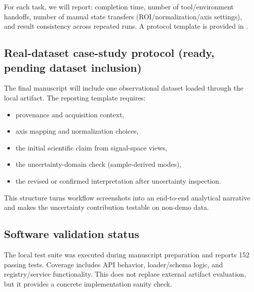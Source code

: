 \documentclass[11pt]{article}
\begin{document}
For each task, we will report: completion time, number of tool/environment handoffs, number of manual state transfers (ROI/normalization/axis settings), and result consistency across repeated runs. A protocol template is provided in .

\subsection{Real-dataset case-study protocol (ready, pending dataset inclusion)}
The final manuscript will include one observational dataset loaded through the local artifact. The reporting template requires:
\begin{itemize}[leftmargin=1.5em]
  \item provenance and acquisition context,
  \item axis mapping and normalization choices,
  \item the initial scientific claim from signal-space views,
  \item the uncertainty-domain check (sample-derived modes),
  \item the revised or confirmed interpretation after uncertainty inspection.
\end{itemize}

This structure turns workflow screenshots into an end-to-end analytical narrative and makes the uncertainty contribution testable on non-demo data.

\subsection{Software validation status}
The local test suite was executed during manuscript preparation and reports 152 passing tests. Coverage includes API behavior, loader/schema logic, and registry/service functionality. This does not replace external artifact evaluation, but it provides a concrete implementation sanity check.
\end{document}
